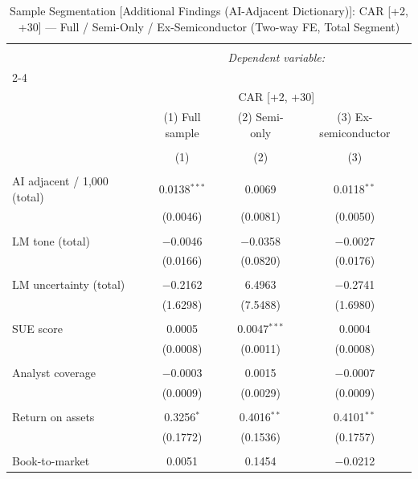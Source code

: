 
\begin{table}[!htbp] \centering 
  \caption{Sample Segmentation [Additional Findings (AI-Adjacent Dictionary)]: CAR [+2, +30] — Full / Semi-Only / Ex-Semiconductor (Two-way FE, Total Segment)} 
  \label{} 
\begin{tabular}{@{\extracolsep{5pt}}lccc} 
\\[-1.8ex]\hline 
\hline \\[-1.8ex] 
 & \multicolumn{3}{c}{\textit{Dependent variable:}} \\ 
\cline{2-4} 
\\[-1.8ex] & \multicolumn{3}{c}{CAR [+2, +30]} \\ 
 & (1) Full sample & (2) Semi-only & (3) Ex-semiconductor \\ 
\\[-1.8ex] & (1) & (2) & (3)\\ 
\hline \\[-1.8ex] 
 AI adjacent / 1,000 (total) & 0.0138$^{***}$ & 0.0069 & 0.0118$^{**}$ \\ 
  & (0.0046) & (0.0081) & (0.0050) \\ 
  & & & \\ 
 LM tone (total) & $-$0.0046 & $-$0.0358 & $-$0.0027 \\ 
  & (0.0166) & (0.0820) & (0.0176) \\ 
  & & & \\ 
 LM uncertainty (total) & $-$0.2162 & 6.4963 & $-$0.2741 \\ 
  & (1.6298) & (7.5488) & (1.6980) \\ 
  & & & \\ 
 SUE score & 0.0005 & 0.0047$^{***}$ & 0.0004 \\ 
  & (0.0008) & (0.0011) & (0.0008) \\ 
  & & & \\ 
 Analyst coverage & $-$0.0003 & 0.0015 & $-$0.0007 \\ 
  & (0.0009) & (0.0029) & (0.0009) \\ 
  & & & \\ 
 Return on assets & 0.3256$^{*}$ & 0.4016$^{**}$ & 0.4101$^{**}$ \\ 
  & (0.1772) & (0.1536) & (0.1757) \\ 
  & & & \\ 
 Book-to-market & 0.0051 & 0.1454 & $-$0.0212 \\ 

\end{tabular}
\end{table}
